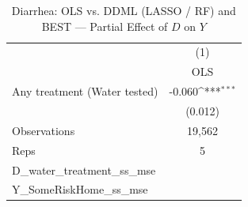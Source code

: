 \begin{table}[htbp]\centering
\def\sym#1{\ifmmode^{#1}\else\(^{#1}\)\fi}
\caption{Diarrhea: OLS vs. DDML (LASSO / RF) and BEST — Partial Effect of $D$ on $Y$}
\begin{tabular}{l*{1}{c}}
\toprule
                &\multicolumn{1}{c}{(1)}\\
                &\multicolumn{1}{c}{OLS}\\
\midrule
Any treatment (Water tested)&   -0.060\sym{***}\\
                &  (0.012)         \\
\midrule
Observations    &   19,562         \\
Reps            &        5         \\
D\_water\_treatment\_ss\_mse&                  \\
Y\_SomeRiskHome\_ss\_mse&                  \\
\bottomrule
\end{tabular}
\end{table}
